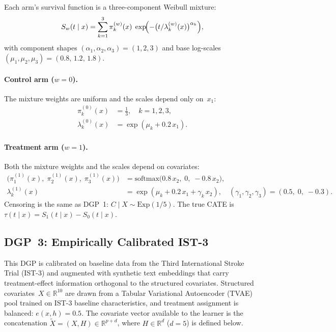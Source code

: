 \documentclass{article}
\newcommand{\R}{\mathbb{R}}
\begin{document}
Each arm's survival function is a three-component Weibull mixture:
\[
  S_w(t \mid x)
  = \sum_{k=1}^{3} \pi_k^{(w)}(x)\;
    \exp\!\Bigl(-\bigl(t / \lambda_k^{(w)}(x)\bigr)^{\alpha_k}\Bigr),
\]
with component shapes $(\alpha_1, \alpha_2, \alpha_3) = (1, 2, 3)$ and base log-scales $(\mu_1, \mu_2, \mu_3) = (0.8,\, 1.2,\, 1.8)$.

\paragraph{Control arm ($w=0$).}
The mixture weights are uniform and the scales depend only on~$x_1$:
\begin{align*}
  \pi_k^{(0)}(x) &= \tfrac{1}{3}, \quad k=1,2,3, \\
  \lambda_k^{(0)}(x) &= \exp(\mu_k + 0.2\, x_1).
\end{align*}

\paragraph{Treatment arm ($w=1$).}
Both the mixture weights and the scales depend on covariates:
\begin{align*}
  \bigl(\pi_1^{(1)}(x),\; \pi_2^{(1)}(x),\; \pi_3^{(1)}(x)\bigr)
    &= \mathrm{softmax}\!\bigl(0.8\, x_2,\; 0,\; -0.8\, x_2\bigr), \\
  \lambda_k^{(1)}(x)
    &= \exp(\mu_k + 0.2\, x_1 + \gamma_k\, x_2),
    \quad (\gamma_1, \gamma_2, \gamma_3) = (0.5,\; 0,\; -0.3).
\end{align*}
Censoring is the same as DGP~1: $C \mid X \sim \mathrm{Exp}(1/5)$.
The true CATE is $\tau(t \mid x) = S_1(t \mid x) - S_0(t \mid x)$.

\subsection*{DGP~3: Empirically Calibrated IST-3}

This DGP is calibrated on baseline data from the Third International Stroke Trial (IST-3) and augmented with synthetic text embeddings that carry treatment-effect information orthogonal to the structured covariates.
Structured covariates~$X \in \R^{10}$ are drawn from a Tabular Variational Autoencoder (TVAE) pool trained on IST-3 baseline characteristics, and treatment assignment is balanced: $e(x, h) = 0.5$.
The covariate vector available to the learner is the concatenation $\tilde X = (X, H) \in \R^{p+d}$, where $H \in \R^{d}$ ($d=5$) is defined below.
\end{document}

